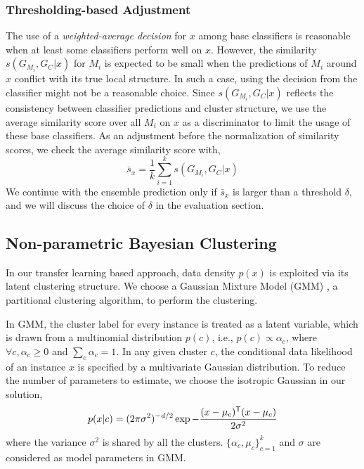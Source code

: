 \subsubsection{Thresholding-based Adjustment}
The use of a \emph{weighted-average decision} for $x$ among base classifiers is reasonable when at least some classifiers perform well on $x$. 
However, the similarity $s(G_{M_i}, G_C|x)$ for $M_i$ is expected to be small when the predictions of $M_i$ around $x$ conflict with its true local structure. 
In such a case, using the decision from the classifier might not be a reasonable choice. 
Since $s(G_{M_i}, G_C|x)$ reflects the consistency between classifier predictions and cluster structure, we use the average similarity score over all $M_i$ on $x$ as a discriminator to limit the usage of these base classifiers.
As an adjustment before the normalization of similarity scores, we check the average similarity score with,
\begin{equation}\label{ave_sim}
 \bar s_x = \frac {1}{k}\sum_{i=1}^k s(G_{M_i}, G_C|x)
\end{equation}
We continue with the ensemble prediction only if $\bar s_x$ is larger than a threshold $\delta$, and we will discuss the choice of $\delta$ in the evaluation section.


\subsection{Non-parametric Bayesian Clustering}
\label{sec_clustering}
In our transfer learning based approach, data density $p(x)$ is exploited via its latent clustering structure. We choose a Gaussian Mixture Model (GMM) \cite{zivkovic2004improved}, a partitional clustering algorithm, to perform the clustering.

In GMM, the cluster label for every instance is treated as a latent variable, which is drawn from a multinomial distribution $p(c)$, i.e., $p(c)\propto\alpha_c$, where $\forall c, \alpha_c\ge0$ and $\sum_c\alpha_c=1$. In any given cluster $c$, the conditional data likelihood of an instance $x$ is specified by a multivariate Gaussian distribution. To reduce the number of parameters to estimate, we choose the isotropic Gaussian in our solution,
\begin{equation}
p(x|c)=(2\pi\sigma^2)^{-d/2}\exp{-\frac{(x-\mu_c)^{\mathsf{T}}(x-\mu_c)}{2\sigma^2}}
\end{equation}
where the variance $\sigma^2$ is shared by all the clusters. $\{\alpha_c, \mu_c\}^k_{c=1}$ and $\sigma$ are considered as model parameters in GMM.

